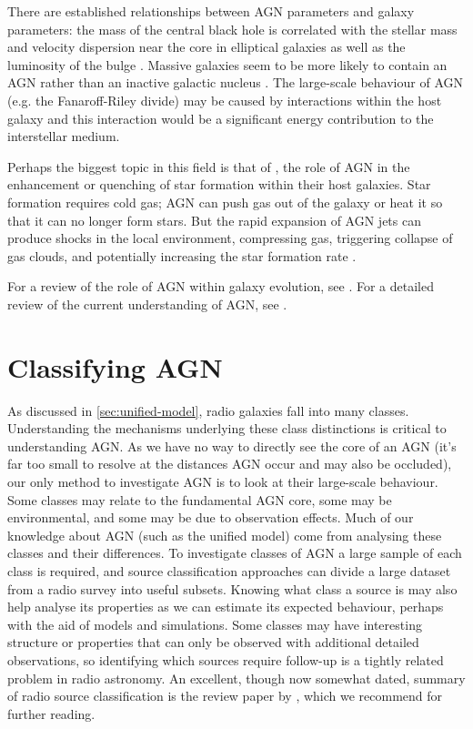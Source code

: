         There are established relationships between AGN parameters and galaxy parameters: the mass of the central black hole is correlated with the stellar mass and velocity dispersion near the core in elliptical galaxies \citep{cattaneo_role_2009} as well as the luminosity of the bulge \citep{kormendy_inward_1995}. Massive galaxies seem to be more likely to contain an AGN rather than an inactive galactic nucleus \citep{hardcastle20feedback}. The large-scale behaviour of AGN (e.g. the Fanaroff-Riley divide) may be caused by interactions within the host galaxy \citep{hardcastle20feedback} and this interaction would be a significant energy contribution to the interstellar medium.

        Perhaps the biggest topic in this field is that of , the role of AGN in the enhancement or quenching of star formation within their host galaxies. Star formation requires cold gas; AGN can push gas out of the galaxy \citep{zubovas_clearing_2012} or heat it so that it can no longer form stars. But the rapid expansion of AGN jets can produce shocks in the local environment, compressing gas, triggering collapse of gas clouds, and potentially increasing the star formation rate \citep{zubovas_collapse_2014}.

        For a review of the role of AGN within galaxy evolution, see \citet{kormendy_coevolution_2013}. For a detailed review of the current understanding of AGN, see \citet{hardcastle20feedback}.

\section{Classifying AGN}
\label{sec:classification-of-agn}

    As discussed in \autoref{sec:unified-model}, radio galaxies fall into many classes. Understanding the mechanisms underlying these class distinctions is critical to understanding AGN. As we have no way to directly see the core of an AGN (it's far too small to resolve at the distances AGN occur and may also be occluded), our only method to investigate AGN is to look at their large-scale behaviour. Some classes may relate to the fundamental AGN core, some may be environmental, and some may be due to observation effects. Much of our knowledge about AGN (such as the unified model) come from analysing these classes and their differences. To investigate classes of AGN a large sample of each class is required, and source classification approaches can divide a large dataset from a radio survey into useful subsets. Knowing what class a source is may also help analyse its properties as we can estimate its expected behaviour, perhaps with the aid of models and simulations. Some classes may have interesting structure or properties that can only be observed with additional detailed observations, so identifying which sources require follow-up is a tightly related problem in radio astronomy. An excellent, though now somewhat dated, summary of radio source classification is the review paper by \citet{urry95unified}, which we recommend for further reading.

